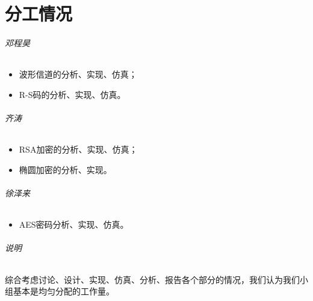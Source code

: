 \part{分工情况}

\paragraph{邓程昊}
\indent

\begin{itemize}
    \item 波形信道的分析、实现、仿真；
    \item R-S码的分析、实现、仿真。
\end{itemize}

\paragraph{齐涛}
\indent

\begin{itemize}
    \item RSA加密的分析、实现、仿真；
    \item 椭圆加密的分析、实现。
\end{itemize}

\paragraph{徐泽来}
\indent

\begin{itemize}
    \item AES密码分析、实现、仿真。
\end{itemize}	

\paragraph{说明}
\indent

综合考虑讨论、设计、实现、仿真、分析、报告各个部分的情况，我们认为我们小组基本是均匀分配的工作量。
